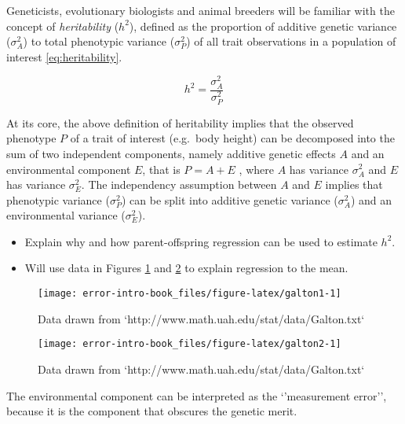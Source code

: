 \documentclass[]{book}
\theoremstyle{definition}
\theoremstyle{definition}
\theoremstyle{definition}
\theoremstyle{remark}
\begin{document}
Geneticists, evolutionary biologists and animal breeders will be
familiar with the concept of \emph{heritability} (\(h^2\)), defined as
the proportion of additive genetic variance (\(\sigma_A^2\)) to total
phenotypic variance (\(\sigma_P^2\)) of all trait observations in a
population of interest \eqref{eq:heritability}.

\begin{equation}
h^2 = \frac{\sigma_A^2}{\sigma_P^2}
\label{eq:heritability}
\end{equation}

At its core, the above definition of heritability implies that the
observed phenotype \(P\) of a trait of interest (e.g.~body height) can
be decomposed into the sum of two independent components, namely
additive genetic effects \(A\) and an environmental component \(E\),
that is \(P = A + E\) , where \(A\) has variance \(\sigma_A^2\) and
\(E\) has variance \(\sigma^2_E\). The independency assumption between
\(A\) and \(E\) implies that phenotypic variance (\(\sigma_P^2\)) can be
split into additive genetic variance (\(\sigma_A^2\)) and an
environmental variance (\(\sigma_E^2\)).

\begin{itemize}
\item
  Explain why and how parent-offspring regression can be used to
  estimate \(h^2\).
\item
  Will use data in Figures \ref{fig:galton1} and \ref{fig:galton2} to
  explain regression to the mean.
\end{itemize}

\begin{figure}

{\centering \texttt{[image: error-intro-book\_files/figure-latex/galton1-1]} 

}

\caption{Data drawn from `http://www.math.uah.edu/stat/data/Galton.txt`}\label{fig:galton1}
\end{figure}

\begin{figure}

{\centering \texttt{[image: error-intro-book\_files/figure-latex/galton2-1]} 

}

\caption{Data drawn from `http://www.math.uah.edu/stat/data/Galton.txt`}\label{fig:galton2}
\end{figure}

The environmental component can be interpreted as the `'measurement
error'', because it is the component that obscures the genetic merit.
\end{document}
